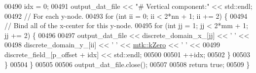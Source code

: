 \begin{DoxyCode}
00490     idx = 0;
00491     output\_dat\_file << \textcolor{stringliteral}{"# Vertical component:"} << std::endl;
00492     \textcolor{comment}{// For each y-node.}
00493     \textcolor{keywordflow}{for} (\textcolor{keywordtype}{int} ii = 0; ii < 2*nn + 1; ii += 2) \{
00494       \textcolor{comment}{// Bind all of the x-center for this y-node.}
00495       \textcolor{keywordflow}{for} (\textcolor{keywordtype}{int} jj = 1; jj < 2*mm + 1; jj += 2) \{
00496 
00497         output\_dat\_file << discrete\_domain\_x\_[jj] << \textcolor{charliteral}{' '} <<
00498           discrete\_domain\_y\_[ii] << \textcolor{charliteral}{' '} << \hyperlink{group__c01-roots_ga59a451a5fae30d59649bcda274fea271}{mtk::kZero} << \textcolor{charliteral}{' '} <<
00499           discrete\_field\_[p\_offset + idx] << std::endl;
00500 
00501         ++idx;
00502       \}
00503     \}
00504   \}
00505 
00506   output\_dat\_file.close();
00507 
00508   \textcolor{keywordflow}{return} \textcolor{keyword}{true};
00509 \}
\end{DoxyCode}
